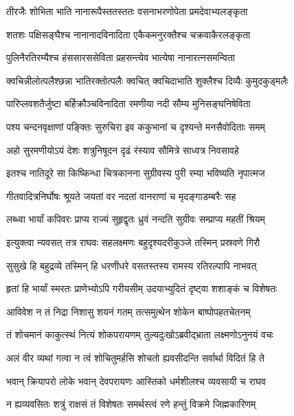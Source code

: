 \twolineshloka
{तीरजैः शोभिता भाति नानारूपैस्ततस्ततः}
{वसनाभरणोपेता प्रमदेवाभ्यलङ्कृता} %

\twolineshloka
{शतशः पक्षिसङ्घैश्च नानानादविनादिता}
{एकैकमनुरक्तैश्च चक्रवाकैरलङ्कृता} %

\twolineshloka
{पुलिनैरतिरम्यैश्च हंससारससेविता}
{प्रहसन्त्येव भात्येषा नानारत्नसमन्विता} %

\twolineshloka
{क्वचिन्नीलोत्पलैश्छन्ना भातिरक्तोत्पलैः क्वचित्}
{क्वचिदाभाति शुक्लैश्च दिव्यैः कुमुदकुड्मलैः} %

\twolineshloka
{पारिप्लवशतैर्जुष्टा बर्हिक्रौञ्चविनादिता}
{रमणीया नदी सौम्य मुनिसङ्घनिषेविता} %

\twolineshloka
{पश्य चन्दनवृक्षाणां पङ्क्तिः सुरुचिरा इव}
{ककुभानां च दृश्यन्ते मनसैवोदिताः समम्} %

\twolineshloka
{अहो सुरमणीयोऽयं देशः शत्रुनिषूदन}
{दृढं रंस्याव सौमित्रे साध्वत्र निवसावहे} %

\twolineshloka
{इतश्च नातिदूरे सा किष्किन्धा चित्रकानना}
{सुग्रीवस्य पुरी रम्या भविष्यति नृपात्मज} %

\twolineshloka
{गीतवादित्रनिर्घोषः श्रूयते जयतां वर}
{नदतां वानराणां च मृदङ्गाडम्बरैः सह} %

\twolineshloka
{लब्ध्वा भार्यां कपिवरः प्राप्य राज्यं सुहृद्वृतः}
{ध्रुवं नन्दति सुग्रीवः सम्प्राप्य महतीं श्रियम्} %

\twolineshloka
{इत्युक्त्वा न्यवसत् तत्र राघवः सहलक्ष्मणः}
{बहुदृश्यदरीकुञ्जे तस्मिन् प्रस्रवणे गिरौ} %

\twolineshloka
{सुसुखे हि बहुद्रव्ये तस्मिन् हि धरणीधरे}
{वसतस्तस्य रामस्य रतिरल्पापि नाभवत्} %

\twolineshloka
{हृतां हि भार्यां स्मरतः प्राणेभ्योऽपि गरीयसीम्}
{उदयाभ्युदितं दृष्ट्वा शशाङ्कं च विशेषतः} %

\twolineshloka
{आविवेश न तं निद्रा निशासु शयनं गतम्}
{तत्समुत्थेन शोकेन बाष्पोपहतचेतनम्} %

\twolineshloka
{तं शोचमानं काकुत्स्थं नित्यं शोकपरायणम्}
{तुल्यदुःखोऽब्रवीद्भ्राता लक्ष्मणोऽनुनयं वचः} %

\twolineshloka
{अलं वीर व्यथां गत्वा न त्वं शोचितुमर्हसि}
{शोचतो ह्यवसीदन्ति सर्वार्था विदितं हि ते} %

\twolineshloka
{भवान् क्रियापरो लोके भवान् देवपरायणः}
{आस्तिको धर्मशीलश्च व्यवसायी च राघव} %

\twolineshloka
{न ह्यव्यवसितः शत्रुं राक्षसं तं विशेषतः}
{समर्थस्त्वं रणे हन्तुं विक्रमे जिह्मकारिणम्} %

